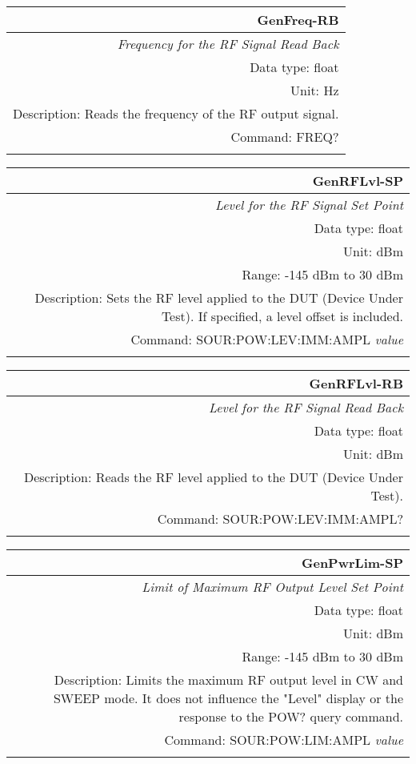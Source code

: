 \documentclass[openany]{article}
\begin{document}
		\begin{tabular}{N}
			\hline
			\bfseries GenFreq-RB \\ \hline
			\emph{Frequency for the RF Signal Read Back} \\
			Data type: float \\
			Unit: Hz \\
			Description: Reads the frequency of the RF output signal. \\
			Command: FREQ? \\
			\\

		\end{tabular}


		\begin{tabular}{N}
			\hline
			\bfseries GenRFLvl-SP \\ \hline
			\emph{Level for the RF Signal Set Point} \\
			Data type: float \\
			Unit: dBm \\
			Range: -145 dBm to 30 dBm \\
			Description: Sets the RF level applied to the DUT (Device Under Test). If specified, a level offset is included. \\
			Command: SOUR:POW:LEV:IMM:AMPL \emph{value} \\
			\\
			
		\end{tabular}


		\begin{tabular}{N}
			\hline
			\bfseries GenRFLvl-RB \\ \hline
			\emph{Level for the RF Signal Read Back} \\
			Data type: float \\
			Unit: dBm \\
			Description: Reads the RF level applied to the DUT (Device Under Test). \\
			Command: SOUR:POW:LEV:IMM:AMPL? \\
			\\ 

		\end{tabular}


		\begin{tabular}{N}
			\hline
			\bfseries GenPwrLim-SP \\ \hline
			\emph{Limit of Maximum RF Output Level Set Point} \\
			Data type: float \\
			Unit: dBm \\
			Range: -145 dBm to 30 dBm \\
			Description: Limits the maximum RF output level in CW and SWEEP mode. It does not influence the "Level" display or the response to the POW? query command. \\
			Command: SOUR:POW:LIM:AMPL \emph{value} \\
			\\
			
		\end{tabular}
\end{document}
